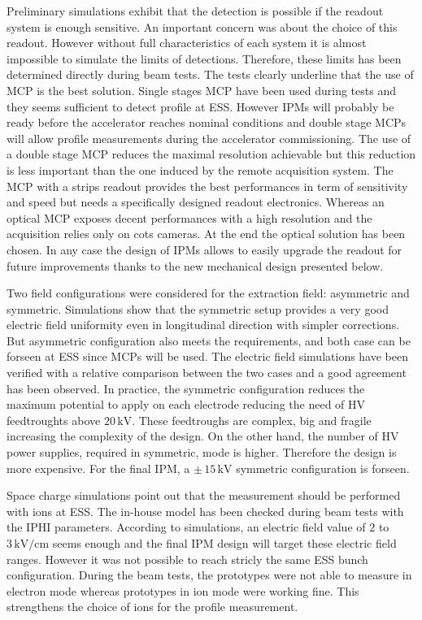 Preliminary simulations exhibit that the detection is possible if the readout system is enough sensitive. An important concern was about the choice of this readout. However without full characteristics of each system it is almost impossible to simulate the limits of detections. Therefore, these limits has been determined directly during beam tests. The tests clearly underline that the use of MCP is the best solution. Single stages MCP have been used during tests and they seems sufficient to detect profile at ESS. However IPMs will probably be ready before the accelerator reaches nominal conditions and double stage MCPs will allow profile measurements during the accelerator commissioning. The use of a double stage MCP reduces the maximal resolution achievable but this reduction is less important than the one induced by the remote acquisition system. The MCP with a strips readout provides the best performances in term of sensitivity and speed but needs a specifically designed readout electronics. Whereas an optical  MCP exposes decent performances with a high resolution and the acquisition relies only on \acrshort{cots} cameras. At the end the optical solution has been chosen. In any case the design of IPMs allows to easily upgrade the readout for future improvements thanks to the new mechanical design presented below.

Two field configurations were considered for the extraction field: asymmetric and symmetric. Simulations show that the symmetric setup provides a very good electric field uniformity even in longitudinal direction with simpler corrections. But asymmetric configuration also meets the requirements, and both case can be forseen at ESS since MCPs will be used. The electric field simulations have been verified with a relative comparison between the two cases and a good agreement has been observed. In practice, the symmetric configuration reduces the maximum potential to apply on each electrode reducing the need of HV feedtroughts above $20\,\mathrm{kV}$. These feedtroughs are complex, big and fragile increasing the complexity of the design. On the other hand, the number of HV power supplies, required in symmetric, mode is higher. Therefore the design is more expensive. For the final IPM, a $\pm\,15\,\mathrm{kV}$ symmetric configuration is forseen.

Space charge simulations point out that the measurement should be performed with ions at ESS. The in-house model has been checked during beam tests with the IPHI parameters. According to simulations, an electric field value of $2$ to $3\,\mathrm{kV/cm}$ seems enough and the final IPM design will target these electric field ranges. However it was not possible to reach stricly the same ESS bunch configuration. During the beam tests, the prototypes were not able to measure in electron mode whereas prototypes in ion mode were working fine. This strengthens the choice of ions for the profile measurement.

